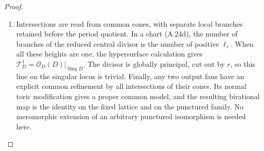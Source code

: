 \begin{proof}
\begin{enumerate}[label=\arabic*.,leftmargin=*]
\item Intersections are read from common cones, with separate
local branches retained before the period quotient. In a
chart (A.24d), the number of branches of the reduced
central divisor is the number of positive $\ell_i$.
When all these heights are one, the hypersurface
calculation gives
$\mathcal T^1_D=\mathcal O_D(D)|_{\operatorname{Sing}D}$.
The divisor is globally principal, cut out by $r$, so this
line on the singular locus is trivial. Finally, any two
output fans have an explicit common refinement by all
intersections of their cones. Its normal toric modification
gives a proper common model, and the resulting birational
map is the identity on the fixed lattice and on the
punctured family. No meromorphic extension of an arbitrary
punctured isomorphism is needed here.
\end{enumerate}
\end{proof}

